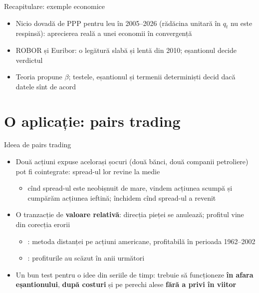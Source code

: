 \begin{frame}{Recapitulare: exemple economice}
\itemsize{\small}
\begin{itemize}
    \item Nicio dovadă de PPP pentru leu în 2005--2026 (rădăcina unitară în $q_t$ nu este respinsă): aprecierea reală a unei economii în convergență
    \item ROBOR și Euribor: o legătură slabă și lentă din 2010; eșantionul decide verdictul
    \item Teoria propune $\beta$; testele, eșantionul și termenii determiniști decid dacă datele sînt de acord
\end{itemize}
\end{frame}


\section{O aplicație: pairs trading}

\begin{frame}{Ideea de pairs trading}
\itemsize{\small}
\begin{itemize}
    \item Două acțiuni expuse acelorași șocuri (două bănci, două companii petroliere) pot fi cointegrate: spread-ul lor revine la medie
    \begin{itemize}
        \item cînd spread-ul este neobișnuit de mare, vindem acțiunea scumpă și cumpărăm acțiunea ieftină; închidem cînd spread-ul a revenit
    \end{itemize}
    \item O tranzacție de \textbf{valoare relativă}: direcția pieței se anulează; profitul vine din corecția erorii
    \begin{itemize}
        \item {}: metoda distanței pe acțiuni americane, profitabilă în perioada 1962--2002
        \item {}: profiturile au scăzut în anii următori
    \end{itemize}
    \item Un bun test pentru o idee din seriile de timp: trebuie să funcționeze \textbf{în afara eșantionului}, \textbf{după costuri} și pe perechi alese \textbf{fără a privi în viitor}
\end{itemize}
\end{frame}


